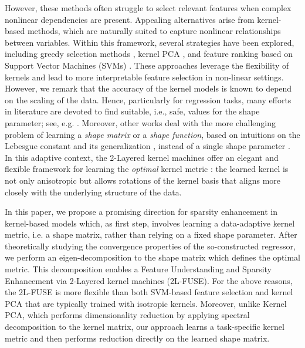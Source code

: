 \documentclass[hyphens,a4paper,11pt]{article}
\begin{document}
However, these methods often struggle to select relevant features when complex nonlinear dependencies are present. 
Appealing alternatives arise from kernel-based methods, which are naturally suited to capture nonlinear relationships between variables. Within this framework, several strategies have been explored, including greedy selection methods \cite{Camattari}, kernel PCA \cite{scholkopf1997kernelpca}, and feature ranking based on Support Vector Machines (SVMs) \cite{Guyon}. These approaches leverage the flexibility of kernels and lead to more interpretable feature selection in non-linear settings. However, we remark that the accuracy of the kernel models is known to depend on the scaling of the data. Hence, particularly for regression tasks, many efforts in literature are devoted to find suitable, i.e., safe, values for the shape parameter; see, e.g. \cite{cavoretto2021search,ling2022stochastic,mojarrad2023new,rippa1999algorithm,scheuerer2011alternative}. Moreover, other works deal with the more challenging problem of learning a \emph{shape matrix} \cite{aiolli2014learning} or a \emph{shape function}, based on intuitions on the Lebesgue constant and its generalization \cite{brunidrna,brunisisc}, instead of a single shape parameter \cite{audonekernel}. In this adaptive context, the 2-Layered kernel machines offer an elegant and flexible framework for learning the \emph{optimal} kernel metric \cite{Doppel2024759,Wenzel}: the learned kernel is not only anisotropic but allows rotations of the kernel basis that aligns more closely with the underlying structure of the data. 

In this paper, we propose a promising direction for sparsity enhancement in kernel-based models which, as first step, involves learning a data-adaptive kernel metric, i.e. a shape matrix, rather than relying on a fixed shape parameter. After theoretically studying the convergence properties of the so-constructed regressor, we perform an eigen-decomposition to the shape matrix which defines the optimal metric. This decomposition enables a Feature Understanding and Sparsity Enhancement via 2-Layered kernel machines (2L-FUSE). For the above reasons, the 2L-FUSE is more flexible than both SVM-based feature selection and kernel PCA that are typically trained with isotropic kernels. Moreover, unlike Kernel PCA, which performs dimensionality reduction by applying spectral decomposition to the kernel matrix, our approach learns a task-specific kernel metric and then performs reduction directly on the learned shape matrix. 
\end{document}
